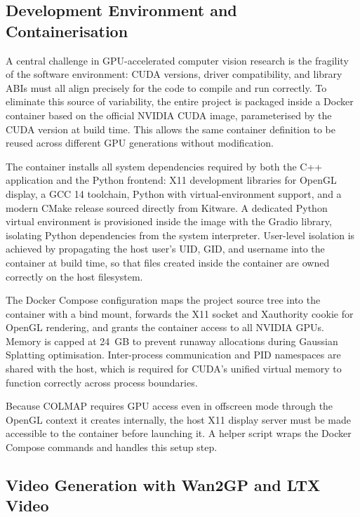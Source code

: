 \documentclass[conference]{IEEEtran}
\begin{document}
\subsection{Development Environment and Containerisation}

A central challenge in GPU-accelerated computer vision research is the fragility of the software environment: CUDA versions, driver compatibility, and library ABIs must all align precisely for the code to compile and run correctly. To eliminate this source of variability, the entire project is packaged inside a Docker container based on the official NVIDIA CUDA image, parameterised by the CUDA version at build time. This allows the same container definition to be reused across different GPU generations without modification.

The container installs all system dependencies required by both the C++ application and the Python frontend: X11 development libraries for OpenGL display, a GCC 14 toolchain, Python with virtual-environment support, and a modern CMake release sourced directly from Kitware. A dedicated Python virtual environment is provisioned inside the image with the Gradio library, isolating Python dependencies from the system interpreter. User-level isolation is achieved by propagating the host user's UID, GID, and username into the container at build time, so that files created inside the container are owned correctly on the host filesystem.

The Docker Compose configuration maps the project source tree into the container with a bind mount, forwards the X11 socket and Xauthority cookie for OpenGL rendering, and grants the container access to all NVIDIA GPUs. Memory is capped at 24~GB to prevent runaway allocations during Gaussian Splatting optimisation. Inter-process communication and PID namespaces are shared with the host, which is required for CUDA's unified virtual memory to function correctly across process boundaries.

Because COLMAP requires GPU access even in offscreen mode through the OpenGL context it creates internally, the host X11 display server must be made accessible to the container before launching it. A helper script wraps the Docker Compose commands and handles this setup step.

\subsection{Video Generation with Wan2GP and LTX Video}
\end{document}
